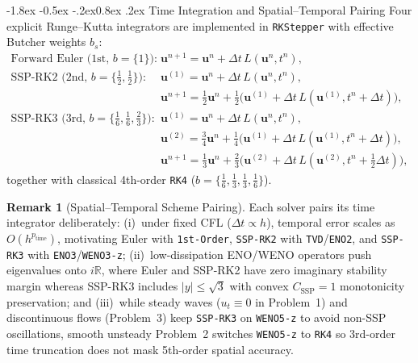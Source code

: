 \documentclass[11pt,a4paper]{article}
\makeatletter
\renewcommand{\subsection}{\@startsection{subsection}{2}{\z@}%
  {-1.8ex \@plus -0.5ex \@minus -.2ex}{0.8ex \@plus .2ex}%
  {\normalfont\normalsize\bfseries\color{specnavy}}}
\newcommand{\R}{\mathbb{R}}
\newcommand{\code}[1]{\texttt{#1}}
\theoremstyle{definition}
\newtheorem{remark}{Remark}[section]
\makeatother
\begin{document}
\subsection{Time Integration and Spatial--Temporal Pairing}
Four explicit Runge--Kutta integrators are implemented in \code{RKStepper} with effective Butcher weights $b_s$:
\begin{align}
\text{Forward Euler (1st, }b=\{1\}\text{):}\quad & \mathbf{u}^{n+1} = \mathbf{u}^n + \Delta t\,L(\mathbf{u}^n,t^n), \label{eq:euler}\\
\text{SSP-RK2 (2nd, }b=\{\tfrac{1}{2},\tfrac{1}{2}\}\text{):}\quad & \mathbf{u}^{(1)} = \mathbf{u}^n + \Delta t\,L(\mathbf{u}^n,t^n),\nonumber\\[-1pt]
& \mathbf{u}^{n+1} = \tfrac{1}{2}\mathbf{u}^n + \tfrac{1}{2}\bigl(\mathbf{u}^{(1)} + \Delta t\,L(\mathbf{u}^{(1)},t^n+\Delta t)\bigr), \label{eq:rk2}\\
\text{SSP-RK3 (3rd, }b=\{\tfrac{1}{6},\tfrac{1}{6},\tfrac{2}{3}\}\text{):}\quad & \mathbf{u}^{(1)} = \mathbf{u}^n + \Delta t\,L(\mathbf{u}^n,t^n),\nonumber\\[-1pt]
& \mathbf{u}^{(2)} = \tfrac{3}{4}\mathbf{u}^n + \tfrac{1}{4}\bigl(\mathbf{u}^{(1)}+\Delta t\,L(\mathbf{u}^{(1)},t^n+\Delta t)\bigr),\nonumber\\[-1pt]
& \mathbf{u}^{n+1} = \tfrac{1}{3}\mathbf{u}^n + \tfrac{2}{3}\bigl(\mathbf{u}^{(2)}+\Delta t\,L(\mathbf{u}^{(2)},t^n+\tfrac{1}{2}\Delta t)\bigr), \label{eq:rk3}
\end{align}
together with classical 4th-order \code{RK4} ($b=\{\tfrac{1}{6},\tfrac{1}{3},\tfrac{1}{3},\tfrac{1}{6}\}$).

\begin{remark}[Spatial--Temporal Scheme Pairing]
Each solver pairs its time integrator deliberately: (i)~under fixed CFL ($\Delta t \propto h$), temporal error scales as $O(h^{p_{\text{time}}})$, motivating Euler with \code{1st-Order}, \code{SSP-RK2} with \code{TVD}/\code{ENO2}, and \code{SSP-RK3} with \code{ENO3}/\code{WENO3-z}; (ii)~low-dissipation ENO/WENO operators push eigenvalues onto $i\R$, where Euler and SSP-RK2 have zero imaginary stability margin whereas SSP-RK3 includes $|y|\le\sqrt{3}$ with convex $C_{\mathrm{SSP}}=1$ monotonicity preservation; and (iii)~while steady waves ($u_t\equiv 0$ in Problem~1) and discontinuous flows (Problem~3) keep \code{SSP-RK3} on \code{WENO5-z} to avoid non-SSP oscillations, smooth unsteady Problem~2 switches \code{WENO5-z} to \code{RK4} so 3rd-order time truncation does not mask 5th-order spatial accuracy.
\end{remark}
\end{document}
